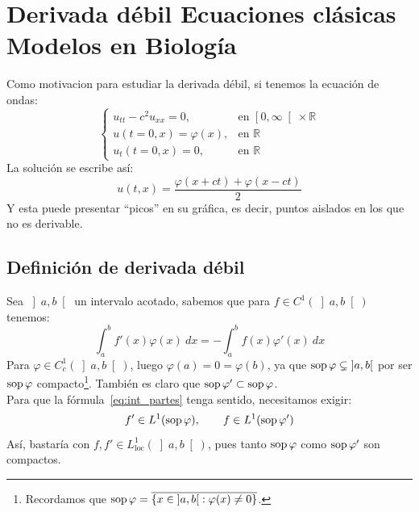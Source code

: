 \chapter{Derivada débil Ecuaciones clásicas Modelos en Biología}

\noindent
Como motivacion para estudiar la derivada débil, si tenemos la ecuación de ondas:
\begin{equation*}
    \left\{\begin{array}{ll}
            u_{tt} - c^2 u_{xx} = 0 , &\text{en\ } \left[0,\infty\right[\times \mathbb{R} \\
                u(t=0,x) = \varphi(x), &\text{en\ } \mathbb{R} \\
                u_t(t=0,x) = 0 , & \text{en\ } \mathbb{R}
    \end{array}\right.
\end{equation*}
La solución se escribe así:
\begin{equation*}
    u(t,x) = \frac{\varphi(x+ct)+\varphi(x-ct)}{2}
\end{equation*}
Y esta puede presentar ``picos'' en su gráfica, es decir, puntos aislados en los que no es derivable.

\section{Definición de derivada débil}
\noindent
Sea $\left]a,b\right[$ un intervalo acotado, sabemos que para $f\in C^1(\left]a,b\right[)$ tenemos:
\begin{equation}\label{eq:int_partes}
    \int_{a}^{b} f'(x)\varphi(x)~dx = -\int_{a}^{b} f(x)\varphi'(x)~dx 
\end{equation}
Para $\varphi \in C^1_c\left(\left]a,b\right[\right)$, luego $\varphi(a) = 0 = \varphi(b)$, ya que $\operatorname{sop} \varphi \subsetneq \left]a,b\right[$ por ser $\operatorname{sop}\varphi$ compacto\footnote{Recordamos que $\operatorname{sop}\varphi = \overline{\{x\in \left]a,b\right[ : \varphi(x)\neq 0\}}$.}. También es claro que $\operatorname{sop}\varphi' \subset \operatorname{sop}\varphi$.\\

\noindent
Para que la fórmula~\eqref{eq:int_partes} tenga sentido, necesitamos exigir:
\begin{equation*}
    f'\in L^1(\operatorname{sop}\varphi), \qquad f\in L^1(\operatorname{sop}\varphi')
\end{equation*}
Así, bastaría con $f,f' \in L^1_{\text{loc}}(\left]a,b\right[)$, pues tanto $\operatorname{sop}\varphi$ como $\operatorname{sop}\varphi'$ son compactos.


